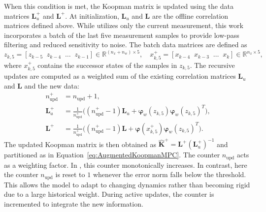 When this condition is met, the Koopman matrix is updated using the data matrices $\mathbf{L}_u^+$ and $\mathbf{L}^+$. At initialization, $\mathbf{L}_u$ and $\mathbf{L}$ are the offline correlation matrices defined above. While \cite{cisneros2020data} utilizes only the current measurement, this work incorporates a batch of the last five measurement samples to provide low-pass filtering and reduced sensitivity to noise. The batch data matrices are defined as
\[
z_{k,5} = [z_{k-5} \;\; z_{k-4} \;\; \dots \;\; z_{k-1}] \in \mathbb{R}^{(n_x + n_w)\times 5}, \quad
x_{k,5}^+ = [x_{k-4} \;\; x_{k-3} \;\; \dots \;\; x_{k}] \in \mathbb{R}^{n_x \times 5},
\]
where $x_{k,5}^+$ contains the successor states of the samples in $z_{k,5}$.
The recursive updates are computed as a weighted sum of the existing correlation matrices $\mathbf{L}_u$ and $\mathbf{L}$ and the new data:
\begin{equation} \label{eq:GA_online}
    \begin{split}
        n_{\text{upd}}^+ &= n_{\text{upd}} + 1,\\
        \mathbf{L}_u^+ &= \frac{1}{n_{\text{upd}}^+} \Big( (n_{\text{upd}}^+-1)\mathbf{L}_u + \bm{\varphi}_w(z_{k,5}) \bm{\varphi}_w(z_{k,5})^T \Big),\\
        \mathbf{L}^+ &= \frac{1}{n_{\text{upd}}^+} \Big( (n_{\text{upd}}^+-1)\mathbf{L} + \bm{\varphi}(x_{k,5}^+) \bm{\varphi}_w(z_{k,5})^T \Big).
    \end{split}
\end{equation}
The updated Koopman matrix is then obtained as $\hat{\bm{K}}^+ = \mathbf{L}^+ (\mathbf{L}_u^+)^{-1}$ and partitioned as in Equation~\eqref{eq:AugmentedKoopmanMPC}.
The counter $n_{\text{upd}}$ acts as a weighting factor. In \cite{cisneros2020data}, this counter monotonically increases. In contrast, here the counter $n_{\text{upd}}$ is reset to $1$ whenever the error norm falls below the threshold. This allows the model to adapt to changing dynamics rather than becoming rigid due to a large historical weight. During active updates, the counter is incremented to integrate the new information.

